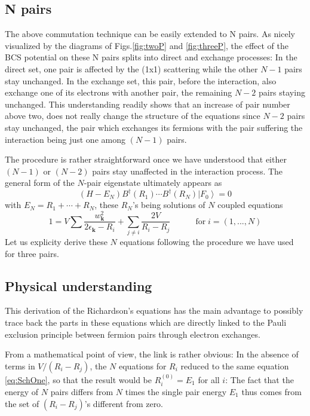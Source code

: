 \documentclass[aps,prb,superscriptaddress,showpacs,reprint,lengthcheck]{revtex4-1}
\begin{document}
\subsection{N pairs}

The above commutation technique can be easily extended to N pairs. As nicely
visualized by the diagrams of Figs.\ref{fig:twoP} and \ref{fig:threeP}, the
effect of the BCS potential on these N pairs splits into direct and exchange processes:
In the direct set, one pair is affected by the (1x1) scattering while the other $N-1
$ pairs stay unchanged. In the exchange set, this pair, before the interaction, also 
exchange one of its electrons with another pair, the remaining $N-2$
pairs staying unchanged. This understanding readily shows that an increase of pair number above two, does not really change the structure of the equations
since $N-2$ pairs stay unchanged, the pair which exchanges its fermions with the
pair suffering the interaction being just one among $(N-1)$ pairs.

The procedure is rather straightforward once we have understood
that either $(N-1)$ or $(N-2)$ pairs stay unaffected in the interaction process. The
general form of the $N$-pair eigenstate ultimately appears as 
\begin{equation}  \label{eq:SchThreeN}
(H-E _N)B^{\dagger}(R_1)\cdots{}B^{\dagger}(R_N)\left|F_0\right>  =0
\end{equation}
with $E _N=R_1+\cdots+R_N$, these $R_N$'s being solutions of $N$ coupled
equations 
\begin{equation}
1=V\sum\frac{w_{\mathbf{k} }^2}{2\epsilon_{\mathbf{k} }-R_i}+\sum_{j\neq{i}}%
\frac{2V}{R_i-R_j}\quad\qquad \text{for}\; i=\left(1,...,N\right) 
\end{equation}
Let us explicity derive these $N$ equations following the procedure we have used for three pairs. 
\subsection{Physical understanding}

This  derivation of the Richardson's equations has the main advantage to
possibly trace back the parts in these equations which are directly linked
to the Pauli exclusion principle between fermion pairs through electron exchanges. 

From a mathematical point of view, the link is rather obvious: In the
absence of terms in $V/(R_i-R_j)$, the $N$ equations for $R_i$ reduced to
the same equation \eqref{eq:SchOne}, so that the result would be $R^{(0)}_i=%
E _1$ for all $i$: The fact that the energy of $N$ pairs differs
from $N$ times the single pair energy $E_1$ thus comes from the set of $(R_i-R_j)$'s
different from zero.
\end{document}
